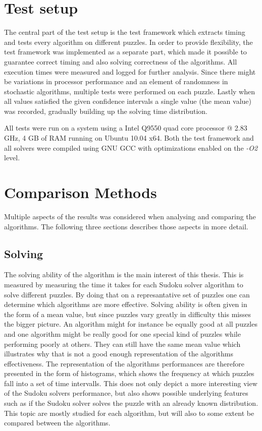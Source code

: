 \documentclass[a4paper,11pt]{kth-mag}
\begin{document}
\FloatBarrier
\section{Test setup}
\label{sec:testSetupMethod}
The central part of the test setup is the test framework which extracts timing and tests every algorithm on different puzzles. 
In order to provide flexibility, the test framework was implemented as a separate part, which made it possible to guarantee correct timing and also solving correctness of the algorithms.
All execution times were measured and logged for further analysis.
Since there might be variations in processor performance and an element of randomness in stochastic algorithms, multiple tests were performed on each puzzle. 
Lastly when all values satisfied the given confidence intervals a single value (the mean value) was recorded, gradually building up the solving time distribution.

All tests were run on a system using a Intel Q9550 quad core processor @ 2.83 GHz, 4 GB of RAM running on Ubuntu 10.04 x64.
Both the test framework and all solvers were compiled using GNU GCC with optimizations enabled on the \emph{-O2} level.

\FloatBarrier
\section{Comparison Methods}
\label{sec:comparisonMethod}
Multiple aspects of the results was considered when analysing and comparing the algorithms. The following three sections describes those aspects in more detail. 

\FloatBarrier
\subsection{Solving}
The solving ability of the algorithm is the main interest of this thesis.
This is measured by measuring the time it takes for each Sudoku solver algorithm to solve different puzzles.
By doing that on a represantative set of puzzles one can determine which algorithms are more effective.
Solving ability is often given in the form of a mean value, but since puzzles vary greatly in difficulty this misses the bigger picture.
An algorithm might for instance be equally good at all puzzles and one algorithm might be really good for one special kind of puzzles while performing poorly at others.
They can still have the same mean value which illustrates why that is not a good enough representation of the algorithms effectiveness.
The representation of the algorithms performances are therefore presented in the form of histograms, which shows the frequency at which puzzles fall into a set of time intervalls.
This does not only depict a more interesting view of the Sudoku solvers performance, but also shows possible underlying features such as if the Sudoku solver solves the puzzle with an already known distribution.
This topic are mostly studied for each algorithm, but will also to some extent be compared between the algorithms.
\end{document}
